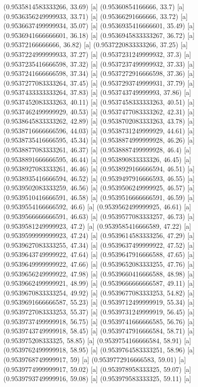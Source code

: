 {{{(0.9535814583333266, 33.69) [a] 
(0.95360854166666, 33.7) [a] 
(0.9536356249999933, 33.71) [a] 
(0.95366291666666, 33.72) [a] 
(0.9536637499999934, 35.07) [a] 
(0.9536935416666601, 35.49) [a] 
(0.9536941666666601, 36.18) [a] 
(0.9536945833333267, 36.72) [a] 
(0.95372166666666, 36.82) [a] 
(0.9537220833333266, 37.25) [a] 
(0.9537224999999933, 37.27) [a] 
(0.9537231249999932, 37.3) [a] 
(0.9537235416666598, 37.32) [a] 
(0.9537237499999932, 37.33) [a] 
(0.9537241666666598, 37.34) [a] 
(0.9537272916666598, 37.36) [a] 
(0.9537277083333264, 37.45) [a] 
(0.9537293749999931, 37.79) [a] 
(0.9537433333333264, 37.83) [a] 
(0.953743749999993, 37.86) [a] 
(0.9537452083333263, 40.11) [a] 
(0.9537458333333263, 40.51) [a] 
(0.9537462499999929, 40.53) [a] 
(0.9537477083333262, 42.31) [a] 
(0.9538645833333262, 42.89) [a] 
(0.9538702083333263, 43.78) [a] 
(0.9538716666666596, 44.03) [a] 
(0.9538731249999929, 44.61) [a] 
(0.9538735416666595, 45.34) [a] 
(0.9538874999999928, 46.26) [a] 
(0.9538877083333261, 46.37) [a] 
(0.9538887499999928, 46.4) [a] 
(0.9538891666666595, 46.44) [a] 
(0.953890833333326, 46.45) [a] 
(0.9538927083333261, 46.46) [a] 
(0.9538929166666594, 46.51) [a] 
(0.9538935416666594, 46.52) [a] 
(0.9539497916666593, 46.55) [a] 
(0.9539502083333259, 46.56) [a] 
(0.9539506249999925, 46.57) [a] 
(0.9539510416666591, 46.58) [a] 
(0.9539516666666591, 46.59) [a] 
(0.9539554166666592, 46.6) [a] 
(0.9539562499999925, 46.61) [a] 
(0.9539566666666591, 46.63) [a] 
(0.9539577083333257, 46.73) [a] 
(0.9539581249999923, 47.2) [a] 
(0.9539585416666589, 47.22) [a] 
(0.9539599999999923, 47.24) [a] 
(0.9539614583333256, 47.29) [a] 
(0.9539627083333255, 47.34) [a] 
(0.9539637499999922, 47.52) [a] 
(0.9539643749999922, 47.64) [a] 
(0.9539647916666588, 47.65) [a] 
(0.9539649999999922, 47.66) [a] 
(0.9539652083333255, 47.76) [a] 
(0.9539656249999922, 47.98) [a] 
(0.9539660416666588, 48.98) [a] 
(0.9539662499999921, 48.99) [a] 
(0.9539666666666587, 49.11) [a] 
(0.9539670833333254, 49.92) [a] 
(0.9539677083333253, 54.82) [a] 
(0.9539691666666587, 55.23) [a] 
(0.9539712499999919, 55.34) [a] 
(0.9539727083333253, 55.37) [a] 
(0.9539731249999919, 56.45) [a] 
(0.9539737499999918, 56.75) [a] 
(0.9539741666666585, 56.76) [a] 
(0.9539743749999918, 58.45) [a] 
(0.9539747916666584, 58.71) [a] 
(0.953975208333325, 58.85) [a] 
(0.9539754166666584, 58.91) [a] 
(0.9539762499999918, 58.95) [a] 
(0.9539764583333251, 58.96) [a] 
(0.9539768749999917, 59) [a] 
(0.9539772916666583, 59.01) [a] 
(0.9539774999999917, 59.02) [a] 
(0.953978958333325, 59.07) [a] 
(0.9539793749999916, 59.08) [a] 
(0.953979583333325, 59.11) [a] 
}}}
